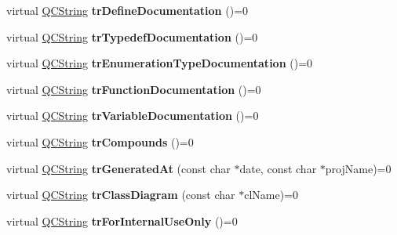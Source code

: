 \begin{DoxyCompactItemize}
\item 
\hypertarget{class_translator_a7926f0b8d96c1d2688770af5b5d5b190}{virtual \hyperlink{class_q_c_string}{Q\-C\-String} {\bfseries tr\-Define\-Documentation} ()=0}\label{class_translator_a7926f0b8d96c1d2688770af5b5d5b190}

\item 
\hypertarget{class_translator_ab6d832cde5d8dfe784bb53a106b47000}{virtual \hyperlink{class_q_c_string}{Q\-C\-String} {\bfseries tr\-Typedef\-Documentation} ()=0}\label{class_translator_ab6d832cde5d8dfe784bb53a106b47000}

\item 
\hypertarget{class_translator_acd606de7f2dc70f3990523b0802860ef}{virtual \hyperlink{class_q_c_string}{Q\-C\-String} {\bfseries tr\-Enumeration\-Type\-Documentation} ()=0}\label{class_translator_acd606de7f2dc70f3990523b0802860ef}

\item 
\hypertarget{class_translator_aca89851e00258629fa561a0abf4dd8b2}{virtual \hyperlink{class_q_c_string}{Q\-C\-String} {\bfseries tr\-Function\-Documentation} ()=0}\label{class_translator_aca89851e00258629fa561a0abf4dd8b2}

\item 
\hypertarget{class_translator_af2e870f7cafc27cfd768f67e6e0d5136}{virtual \hyperlink{class_q_c_string}{Q\-C\-String} {\bfseries tr\-Variable\-Documentation} ()=0}\label{class_translator_af2e870f7cafc27cfd768f67e6e0d5136}

\item 
\hypertarget{class_translator_ab123a55c288a53299ce5a9c450d8db27}{virtual \hyperlink{class_q_c_string}{Q\-C\-String} {\bfseries tr\-Compounds} ()=0}\label{class_translator_ab123a55c288a53299ce5a9c450d8db27}

\item 
\hypertarget{class_translator_a449b819d1716c564a46dc8f00ca54106}{virtual \hyperlink{class_q_c_string}{Q\-C\-String} {\bfseries tr\-Generated\-At} (const char $\ast$date, const char $\ast$proj\-Name)=0}\label{class_translator_a449b819d1716c564a46dc8f00ca54106}

\item 
\hypertarget{class_translator_a5ff24618ed1204aafb80c2d7fce5b0ed}{virtual \hyperlink{class_q_c_string}{Q\-C\-String} {\bfseries tr\-Class\-Diagram} (const char $\ast$cl\-Name)=0}\label{class_translator_a5ff24618ed1204aafb80c2d7fce5b0ed}

\item 
\hypertarget{class_translator_abd0c39d606f4358de0becbc95e684e89}{virtual \hyperlink{class_q_c_string}{Q\-C\-String} {\bfseries tr\-For\-Internal\-Use\-Only} ()=0}\label{class_translator_abd0c39d606f4358de0becbc95e684e89}


\end{DoxyCompactItemize}
